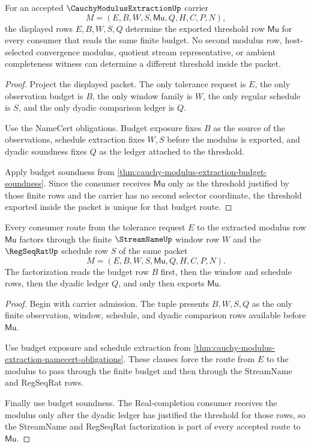 \begin{theorem}
\label{thm:cauchy-modulus-extraction-budget-threshold-uniqueness}
For an accepted $\CauchyModulusExtractionUp$ carrier
$$
M=(E,B,W,S,\mathsf{Mu},Q,H,C,P,N),
$$
the displayed rows $E,B,W,S,Q$ determine the exported threshold row $\mathsf{Mu}$ for every consumer that reads the same finite budget. No second modulus row, host-selected convergence modulus, quotient stream representative, or ambient completeness witness can determine a different threshold inside the packet.
\end{theorem}
\begin{proof}
Project the displayed packet. The only tolerance request is $E$, the only observation budget is $B$, the only window family is $W$, the only regular schedule is $S$, and the only dyadic comparison ledger is $Q$.

Use the NameCert obligations. Budget exposure fixes $B$ as the source of the observations, schedule extraction fixes $W,S$ before the modulus is exported, and dyadic soundness fixes $Q$ as the ledger attached to the threshold.

Apply budget soundness from \autoref{thm:cauchy-modulus-extraction-budget-soundness}. Since the consumer receives $\mathsf{Mu}$ only as the threshold justified by those finite rows and the carrier has no second selector coordinate, the threshold exported inside the packet is unique for that budget route.
\end{proof}

\begin{theorem}
\label{thm:cauchy-modulus-extraction-streamname-regseqrat-factorization}
Every consumer route from the tolerance request $E$ to the extracted modulus row $\mathsf{Mu}$ factors through the finite $\StreamNameUp$ window row $W$ and the $\RegSeqRatUp$ schedule row $S$ of the same packet
$$
M=(E,B,W,S,\mathsf{Mu},Q,H,C,P,N).
$$
The factorization reads the budget row $B$ first, then the window and schedule rows, then the dyadic ledger $Q$, and only then exports $\mathsf{Mu}$.
\end{theorem}
\begin{proof}
Begin with carrier admission. The tuple presents $B,W,S,Q$ as the only finite observation, window, schedule, and dyadic comparison rows available before $\mathsf{Mu}$.

Use budget exposure and schedule extraction from \autoref{thm:cauchy-modulus-extraction-namecert-obligations}. These clauses force the route from $E$ to the modulus to pass through the finite budget and then through the StreamName and RegSeqRat rows.

Finally use budget soundness. The Real-completion consumer receives the modulus only after the dyadic ledger has justified the threshold for those rows, so the StreamName and RegSeqRat factorization is part of every accepted route to $\mathsf{Mu}$.
\end{proof}

